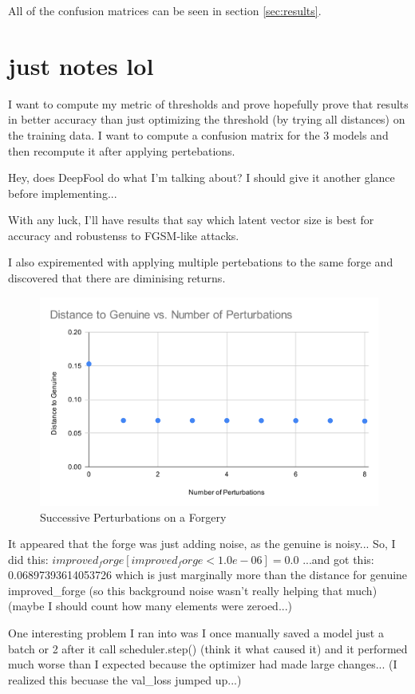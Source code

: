 All of the confusion matrices can be seen in section \ref{sec:results}.



\section{just notes lol}
I want to compute my metric of thresholds and prove hopefully prove that results in better accuracy than just optimizing the threshold (by trying all distances) on the training data.
I want to compute a confusion matrix for the 3 models and then recompute it after applying pertebations.

Hey, does DeepFool do what I'm talking about?
    I should give it another glance before implementing...

With any luck, I'll have results that say which latent vector size is best for accuracy and robustenss to FGSM-like attacks.

I also expiremented with applying multiple pertebations to the same forge and discovered that there are diminising returns.
\begin{figure}[h]
    \begin{center}
        \includegraphics[width=0.8\linewidth]{dist_pert_plot.png}
    \end{center}
    \caption{Successive Perturbations on a Forgery}
    \label{fig:siamese}
\end{figure}

It appeared that the forge was just adding noise, as the genuine is noisy...
So, I did this:
$improved_forge[improved_forge < 1.0e-06] = 0.0$
...and got this:
0.06897393614053726
which is just marginally more than the distance for genuine improved\_forge
(so this background noise wasn't really helping that much)
(maybe I should count how many elements were zeroed...)


One interesting problem I ran into was I once manually saved a model just a batch or 2 after it call scheduler.step() (think it what caused it) and it performed much worse than I expected because the optimizer had made large changes... (I realized this becuase the val\_loss jumped up...)
